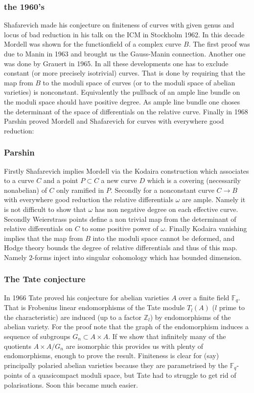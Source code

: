 \documentclass{beamer}
\begin{document}
\begin{frame}
\frametitle{the 1960's}
 Shafarevich made his conjecture on finiteness of curves with given genus and locus of bad reduction in his talk on the ICM in Stockholm 1962.
In this decade Mordell was shown for the functionfield of a complex curve $B$. The first proof was due to Manin in 1963 and brought us the Gauss-Manin connection. Another one was done by Grauert in 1965.  In all these developments one has to exclude constant (or more precisely isotrivial) curves. That is done by requiring that the map from $B$ to the moduli space of curves (or to the moduli space of abelian varieties) is nonconstant. Equivalently the pullback of an ample line bundle on the moduli space should have positive degree. As ample line bundle one choses the determinant of the space of differentials on the relative curve. Finally in 1968 Parshin proved Mordell and Shafarevich for curves with everywhere good reduction:

\end{frame}
\begin{frame}
\frametitle{Parshin}
Firstly Shafarevich implies Mordell via the Kodaira construction which associates to a curve $C$ and a point $P \subset C$ a new curve $D$ which is a covering (necessarily nonabelian) of $C$ only ramified in $P$. Secondly for a nonconstant curve $C \rightarrow B$ with everywhere good reduction the relative differentials $\omega$ are ample. Namely it is not difficult to show that $\omega$ has non negative degree on each effective curve. Secondly Weierstrass points define a non trivial map from the determinant of relative differentials on $C$ to some positive power of $\omega$. Finally Kodaira vanishing implies that the map from $B$ into the moduli space cannot be deformed, and Hodge theory bounds the degree of relative differentials and thus of this map. Namely $2$-forms inject into singular cohomology which has bounded dimension.
\end{frame}
\begin{frame}
\frametitle{The Tate conjecture}
In 1966 Tate proved his conjecture for abelian varieties $A$ over a finite field $\mathbb{F}_q$. That is Frobenius linear endomorphisms of the Tate module $T_l(A)$ ($l$ prime to the characteristic) are induced (up to a factor $\mathbb{Z}_l$) by endomorphisms of the abelian variety. For the proof note that the graph of the endomorphism induces a sequence of subgroups $G_n \subset A \times A$. If we show that infinitely many of the quotients $A \times A/G_n$ are isomorphic this provides us with plenty of endomorphisms, enough to prove the result. Finiteness is clear for (say) principally polaried abelian varieties because they are parametrised by the $\mathbb{F}_q$-points of a quasicompact moduli space, but Tate had to struggle to get rid of polarisations. Soon this became much easier.
\end{frame}
\end{document}
